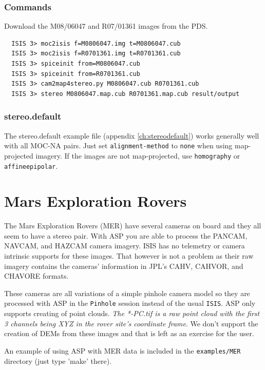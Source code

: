 \subsubsection*{Commands}

Download the M08/06047 and R07/01361 images from the \ac{PDS}.

\begin{verbatim}
  ISIS 3> moc2isis f=M0806047.img t=M0806047.cub
  ISIS 3> moc2isis f=R0701361.img t=R0701361.cub
  ISIS 3> spiceinit from=M0806047.cub
  ISIS 3> spiceinit from=R0701361.cub
  ISIS 3> cam2map4stereo.py M0806047.cub R0701361.cub
  ISIS 3> stereo M0806047.map.cub R0701361.map.cub result/output
\end{verbatim}

\subsubsection*{stereo.default}

The stereo.default example file (appendix \ref{ch:stereodefault}) works
generally well with all MOC-NA pairs. Just set \texttt{alignment-method}
to \texttt{none} when using map-projected imagery. If the images are not
map-projected, use \texttt{homography} or \texttt{affineepipolar}.

\section{Mars Exploration Rovers}\label{mer:example}

The Mars Exploration Rovers (MER) have several cameras on board
and they all seem to have a stereo pair. With ASP you are able to
process the PANCAM, NAVCAM, and HAZCAM camera imagery. ISIS has no
telemetry or camera intrinsic supports for these images. That however is
not a problem as their raw imagery contains the cameras' information in
JPL's CAHV, CAHVOR, and CHAVORE formats.

These cameras are all variations of a simple pinhole camera model so
they are processed with ASP in the \texttt{Pinhole} session instead of
the usual \texttt{ISIS}. ASP only supports creating of point
clouds. \emph{The *-PC.tif is a raw point cloud with the first 3
  channels being XYZ in the rover site's coordinate frame}. We don't
support the creation of DEMs from these images and that is left as an
exercise for the user.

An example of using ASP with MER data is included in the
\texttt{examples/MER} directory (just type 'make' there).

